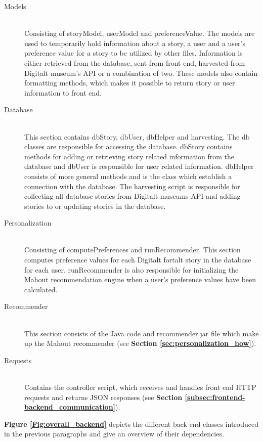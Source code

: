 \begin{description}
	\item[Models] \hfill \\
	Consisting of storyModel, userModel and preferenceValue. The models are used to temporarily hold information about a story, a user and a user’s preference value for a story to be utilized by other files. Information is either retrieved from the database, sent from front end, harvested from Digitalt museum’s API or a combination of two. These models also contain formatting methods, which makes it possible to return story or user information to front end.
	
	\item[Database] \hfill \\
	This section contains dbStory, dbUser, dbHelper and harvesting. The db classes are responsible for accessing the database. dbStory contains methods for adding or retrieving story related information from the database and dbUser is responsible for user related information. dbHelper consists of more general methods and is the class which establish a connection with the database. The harvesting script is responsible for collecting all database stories from Digitalt museums API and adding stories to or updating stories in the database. 
	
	\item[Personalization] \hfill \\
	Consisting of computePreferences and runRecommender. This section computes preference values for each Digitalt fortalt story in the database for each user. runRecommender is also responsible for initializing the Mahout recommendation engine when a user’s preference values have been calculated.
	
	\item[Recommender] \hfill \\
	This section consists of the Java code and recommender.jar file which make up the Mahout recommender (see \textbf{Section \ref{sec:personalization_how}}).
	
	\item[Requests] \hfill \\
	Contains the controller script, which receives and handles front end HTTP requests and returns JSON responses (see \textbf{Section \ref{subsec:frontend-backend_communication}}).
	
\end{description}

\textbf{Figure \ref{Fig:overall_backend}} depicts the different back end classes introduced in the previous paragraphs and give an overview of their dependencies.

